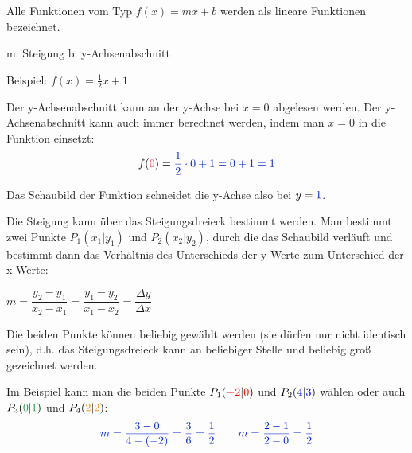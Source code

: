 
Alle Funktionen vom Typ \(f(x)=mx+b\) werden als lineare Funktionen bezeichnet.
\begin{tcolorbox}
	\centering\textcolor{loestc}{m: Steigung \qquad	b: y-Achsenabschnitt}
\end{tcolorbox}

Beispiel: \(f(x)=\frac{1}{2}x+1\)

%

\medskip

Der y-Achsenabschnitt kann an der y-Achse bei \(x=0\) abgelesen werden. Der y-Achsenabschnitt kann auch immer berechnet werden, indem man \(x=0\) in die Funktion einsetzt:
\begin{align*}
    f(\textcolor{red}{0})=\textcolor{loes}{\frac{1}{2}\cdot 0+1=0+1=1}
\end{align*}

Das Schaubild der Funktion schneidet die y-Achse also bei \(y=\textcolor{loes}{1}\)\textcolor{loes}{.}

Die Steigung kann über das Steigungsdreieck bestimmt werden. Man bestimmt zwei Punkte \(P_1(x_1|y_1)\) und \(P_2(x_2|y_2)\), durch die das Schaubild verläuft und bestimmt dann das Verhältnis des Unterschieds der y-Werte zum Unterschied der x-Werte:
\begin{tcolorbox}
	\centering\textcolor{loestc}{\(m=\dfrac{y_2-y_1}{x_2-x_1}=\dfrac{y_1-y_2}{x_1-x_2}=\dfrac{\Delta y}{\Delta x}\)}
\end{tcolorbox}
Die beiden Punkte können beliebig gewählt werden (sie dürfen nur nicht identisch sein), d.h. das Steigungsdreieck kann an beliebiger Stelle und beliebig groß gezeichnet werden.

Im Beispiel kann man die beiden Punkte \(P_1(\textcolor{red}{-2}|\textcolor{red}{0})\) und \(P_2(\textcolor{blue}{4}|\textcolor{blue}{3})\) wählen oder auch \(P_3(\textcolor{ForestGreen}{0}|\textcolor{ForestGreen}{1})\) und \(P_4(\textcolor{YellowOrange}{2}|\textcolor{YellowOrange}{2})\):
\begin{align*}
	\textcolor{loes}{m=\dfrac{3-0}{4-(-2)}=\dfrac{3}{6}=\dfrac{1}{2}
	\qquad
	m=\dfrac{2-1}{2-0}=\dfrac{1}{2}}
\end{align*}

